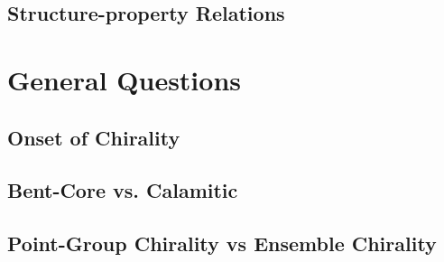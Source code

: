 \documentclass{tufte-handout}
\begin{document}
\subsection{Structure-property Relations} %
\section{General Questions}
\subsection{Onset of Chirality}
\subsection{Bent-Core vs. Calamitic} %
\subsection{Point-Group Chirality vs Ensemble Chirality}

\end{document}
